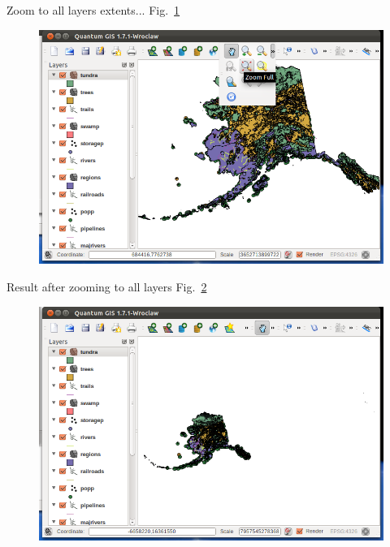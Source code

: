 Zoom to all layers extents... Fig.~\ref{fig:qgis004}

\begin{figure}[htbp]
   \centering
   \includegraphics[scale=0.19]{qgis004.png}
   \caption{}
   \label{fig:qgis004}
\end{figure}

Result after zooming to all layers Fig.~\ref{fig:qgis005}

\begin{figure}[htbp]
   \centering
   \includegraphics[scale=0.35]{qgis005.png}
   \caption{}
   \label{fig:qgis005}
\end{figure}


